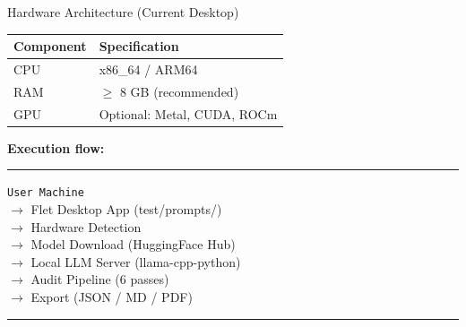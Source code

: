 \documentclass[aspectratio=169,11pt]{beamer}
\begin{document}
\begin{frame}{Hardware Architecture (Current Desktop)}
  \centering
  \footnotesize
  \begin{tabular}{ll}
    \toprule
    \textbf{Component} & \textbf{Specification} \\
    \midrule
    CPU & x86\_64 / ARM64 \\
    RAM & $\geq$ 8 GB (recommended) \\
    GPU & Optional: Metal, CUDA, ROCm \\
    \bottomrule
  \end{tabular}

  \vspace{0.5em}
  \textbf{Execution flow:}

  \smallskip
  \noindent\rule{\textwidth}{0.4pt}
  \footnotesize
  \texttt{User Machine} \\
  \hspace{1em}$\rightarrow$ Flet Desktop App (test/prompts/) \\
  \hspace{2em}$\rightarrow$ Hardware Detection \\
  \hspace{2em}$\rightarrow$ Model Download (HuggingFace Hub) \\
  \hspace{2em}$\rightarrow$ Local LLM Server (llama-cpp-python) \\
  \hspace{2em}$\rightarrow$ Audit Pipeline (6 passes) \\
  \hspace{2em}$\rightarrow$ Export (JSON / MD / PDF) \\
  \noindent\rule{\textwidth}{0.4pt}
\end{frame}
\end{document}
